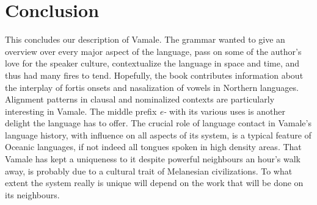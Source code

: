 
\chapter{Conclusion} %
\label{Chapter5} %

%
%
%
%
%	
%	
%
%
\begin{sloppypar}
This concludes our description of Vamale. The grammar wanted to give an overview over every major aspect of the language, pass on some of the author's love for the speaker culture, contextualize the language in space and time, and thus had many fires to tend. Hopefully, the book contributes information about the interplay of fortis onsets and nasalization of vowels in Northern languages. Alignment patterns in clausal and nominalized contexts are particularly interesting in Vamale. The middle prefix \textit{e-} with its various uses is another delight the language has to offer. The crucial role of language contact in Vamale's language history, with influence on all aspects of its system, is a typical feature of Oceanic languages, if not indeed all tongues spoken in high density areas. That Vamale has kept a uniqueness to it despite powerful neighbours an hour's walk away, is probably due to a cultural trait of Melanesian civilizations. To what extent the system really is unique will depend on the work that will be done on its neighbours.
\end{sloppypar}


